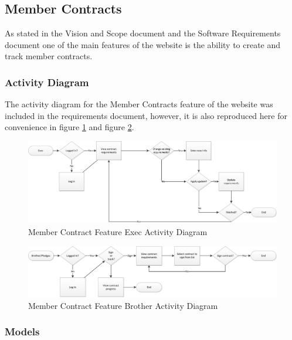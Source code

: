 \documentclass{article}
\begin{document}
\subsection{Member Contracts}

As stated in the Vision and Scope document and the Software Requirements document one of the main features of the website is the ability to create and track member contracts.

\subsubsection{Activity Diagram}
The activity diagram for the Member Contracts feature of the website was included in the requirements document, however, it is also reproduced here for convenience in figure \ref{fig:memberContractExecActivityDiagram} and figure \ref{fig:memberContractBrotherActivityDiagram}.

\FloatBarrier
\begin{figure}
\centering
\includegraphics[scale=.65]{img/activityDiagrams/memberContractActivity1}
\caption{Member Contract Feature Exec Activity Diagram}
\label{fig:memberContractExecActivityDiagram}
\end{figure}
\FloatBarrier

\FloatBarrier
\begin{figure}
\centering
\includegraphics[scale=.65]{img/activityDiagrams/memberContractActivity2}
\caption{Member Contract Feature Brother Activity Diagram}
\label{fig:memberContractBrotherActivityDiagram}
\end{figure}
\FloatBarrier

\subsubsection{Models}
\end{document}
